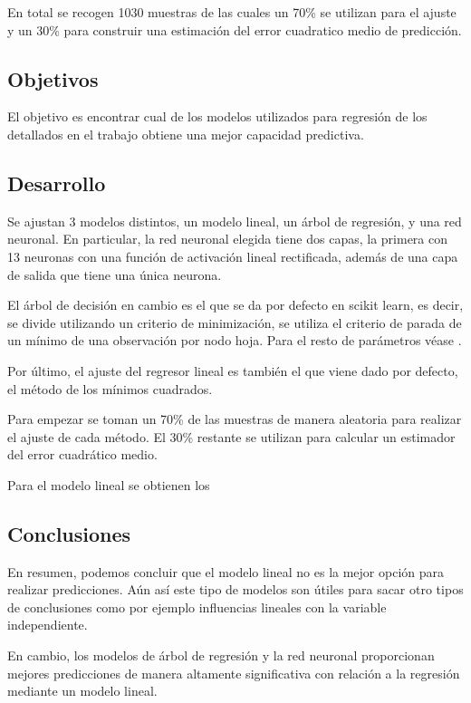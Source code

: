 \noindent 

\noindent En total se recogen 1030 muestras de las cuales un 70\% se utilizan para el ajuste y un 30\% para construir una estimación del error cuadratico medio de predicción. 
\subsection*{Objetivos} 

\noindent El objetivo es encontrar cual de los modelos utilizados para regresión de los detallados en el trabajo obtiene una mejor capacidad predictiva. 
\subsection*{Desarrollo}
\noindent Se ajustan 3 modelos distintos, un modelo lineal, un árbol de regresión, y una red neuronal. 
En particular, la red neuronal elegida tiene dos capas, la primera con 13 neuronas con una función de activación lineal rectificada, además de una capa de salida que tiene una única neurona. 

\noindent El árbol de decisión en cambio es el que se da por defecto en scikit learn, es decir, se divide utilizando un criterio de minimización, se utiliza el criterio de parada de un mínimo de una observación por nodo hoja. Para el resto de parámetros véase \cite{Scikit-Learn}.

\noindent Por último, el ajuste del regresor lineal es también el que viene dado por defecto, el método de los mínimos cuadrados. 

\noindent Para empezar se toman un 70\% de las muestras de manera aleatoria para realizar el ajuste de cada método. El 30\%  restante se utilizan para calcular un estimador del error cuadrático medio.

Para el modelo lineal se obtienen los 

\subsection*{Conclusiones}
\noindent En resumen, podemos concluir que el modelo lineal no es la mejor opción para realizar predicciones. Aún así este tipo de modelos son útiles para sacar otro tipos de conclusiones como por ejemplo influencias lineales con la variable independiente. 

\noindent En cambio, los modelos de árbol de regresión y la red neuronal proporcionan mejores predicciones de manera altamente significativa con relación a la regresión mediante un modelo lineal. 